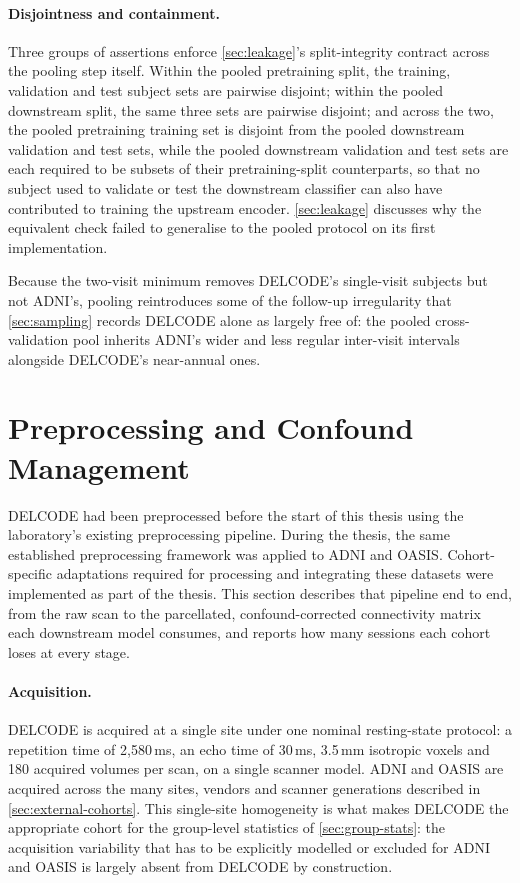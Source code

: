 \paragraph{Disjointness and containment.} Three groups of assertions enforce
\autoref{sec:leakage}'s split-integrity contract across the pooling step itself. Within the
pooled pretraining split, the training, validation and test subject sets are pairwise
disjoint; within the pooled downstream split, the same three sets are pairwise disjoint;
and across the two, the pooled pretraining training set is disjoint from the pooled
downstream validation and test sets, while the pooled downstream validation and test sets
are each required to be subsets of their pretraining-split counterparts, so that no subject
used to validate or test the downstream classifier can also have contributed to training
the upstream encoder. \autoref{sec:leakage} discusses why the equivalent check failed to
generalise to the pooled protocol on its first implementation.

Because the two-visit minimum removes \ac{DELCODE}'s single-visit subjects but not \ac{ADNI}'s,
pooling reintroduces some of the follow-up irregularity that \autoref{sec:sampling}
records \ac{DELCODE} alone as largely free of: the pooled cross-validation pool inherits
\ac{ADNI}'s wider and less regular inter-visit intervals alongside \ac{DELCODE}'s
near-annual ones.

\section{Preprocessing and Confound Management}\label{sec:preprocessing}

\ac{DELCODE} had been preprocessed before the start of this thesis using the laboratory's
existing preprocessing pipeline. During the thesis, the same established preprocessing
framework was applied to \ac{ADNI} and \ac{OASIS}. Cohort-specific adaptations required for
processing and integrating these datasets were implemented as part of the thesis. This
section describes that pipeline end to end, from the raw scan to the parcellated,
confound-corrected connectivity matrix each downstream model consumes, and reports how many
sessions each cohort loses at every stage.

\paragraph{Acquisition.} \ac{DELCODE} is acquired at a single site under one nominal
resting-state protocol: a repetition time of 2{,}580\,ms, an echo time of 30\,ms, 3.5\,mm
isotropic voxels and 180 acquired volumes per scan, on a single scanner model. \ac{ADNI}
and \ac{OASIS} are acquired across the many sites, vendors and scanner generations
described in \autoref{sec:external-cohorts}. This single-site homogeneity is what makes
\ac{DELCODE} the appropriate cohort for the group-level statistics of
\autoref{sec:group-stats}: the acquisition variability that has to be explicitly modelled
or excluded for \ac{ADNI} and \ac{OASIS} is largely absent from \ac{DELCODE} by
construction.


